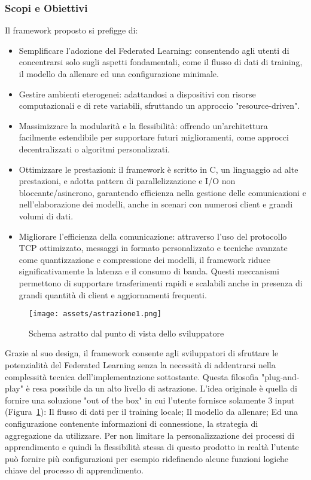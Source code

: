 \documentclass[a4paper, oneside, openright]{report}
\begin{document}
\subsubsection*{Scopi e Obiettivi}
Il framework proposto si prefigge di:
\begin{itemize}
    \item Semplificare l'adozione del Federated Learning: consentendo agli utenti di concentrarsi solo sugli aspetti fondamentali, come il flusso di dati di training, il modello da allenare ed una configurazione minimale.
    \item Gestire ambienti eterogenei: adattandosi a dispositivi con risorse computazionali e di rete variabili, sfruttando un approccio "resource-driven".
    
    \item Massimizzare la modularità e la flessibilità: offrendo un'architettura facilmente estendibile per supportare futuri miglioramenti, come approcci decentralizzati o algoritmi personalizzati.

    \item Ottimizzare le prestazioni: il framework è scritto in C, un linguaggio ad alte prestazioni, e adotta pattern di parallelizzazione e I/O non bloccante/asincrono, garantendo efficienza nella gestione delle comunicazioni e nell'elaborazione dei modelli, anche in scenari con numerosi client e grandi volumi di dati.

    \item Migliorare l’efficienza della comunicazione: attraverso l’uso del protocollo TCP ottimizzato, messaggi in formato personalizzato e tecniche avanzate come quantizzazione e compressione dei modelli, il framework riduce significativamente la latenza e il consumo di banda. Questi meccanismi permettono di supportare trasferimenti rapidi e scalabili anche in presenza di grandi quantità di client e aggiornamenti frequenti.
\end{itemize}

\begin{figure}[h]
\centering
\texttt{[image: assets/astrazione1.png]}
\caption{Schema astratto dal punto di vista dello sviluppatore}\label{fig:archAstr}
\end{figure}

Grazie al suo design, il framework consente agli sviluppatori di sfruttare le potenzialità del Federated Learning senza la necessità di addentrarsi nella complessità tecnica dell'implementazione sottostante. Questa filosofia "plug-and-play" è resa possibile da un alto livello di astrazione. L'idea originale è quella di fornire una soluzione "out of the box" in cui l'utente fornisce solamente 3 input (Figura~\ref{fig:archAstr}): Il flusso di dati per il training locale; Il modello da allenare; Ed una configurazione contenente informazioni di connessione, la strategia di aggregazione da utilizzare. Per non limitare la personalizzazione dei processi di apprendimento e quindi la flessibilità stessa di questo prodotto in realtà l'utente può fornire più configurazioni per esempio ridefinendo alcune funzioni logiche chiave del processo di apprendimento.
\end{document}
